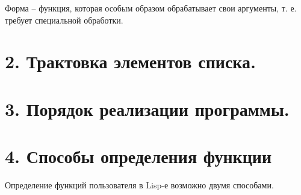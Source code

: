 \documentclass[12pt]{report}
\begin{document}
Форма -- функция, которая особым образом обрабатывает свои аргументы, т. е. требует специальной обработки.





\section*{2. Трактовка элементов списка.}


\section*{3. Порядок реализации программы.}


\section*{4. Способы определения функции}

Определение функций пользователя в Lisp-е возможно двумя способами.
\end{document}
